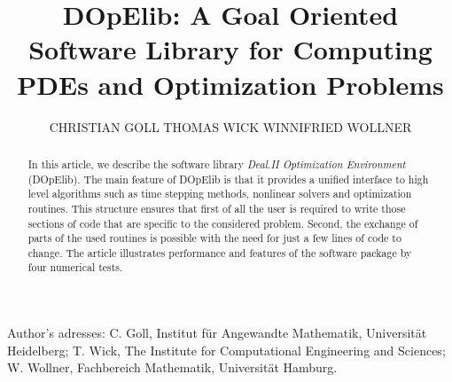 \documentclass[prodmode,acmtoms]{acmsmall}
\numberwithin{equation}{section}
\begin{document}

\title{DOpElib: A Goal Oriented Software Library for Computing PDEs and Optimization Problems}

\author{CHRISTIAN GOLL
THOMAS WICK
WINNIFRIED WOLLNER
}


\begin{abstract}
In this article, we describe the software library 
\textit{Deal.II Optimization Environment} (DOpElib).
The main feature of DOpElib is that it provides a unified interface to high level algorithms 
such as time stepping methods, nonlinear solvers and optimization routines. This structure ensures 
that first of all the user is required to write those sections of code that are specific to 
the considered problem. Second, the exchange of parts of the used routines is possible 
with the need for just a few lines of code to change.
The article illustrates performance and features 
of the software package by four numerical tests. 
\end{abstract}





\begin{bottomstuff}
Author's adresses: C. Goll, Institut f\"ur Angewandte Mathematik,
Universit\"at Heidelberg;
T. Wick, The Institute for Computational Engineering and Sciences;
W. Wollner, Fachbereich Mathematik, Universit\"at Hamburg.
\end{bottomstuff}
                      

\maketitle


\end{document}
